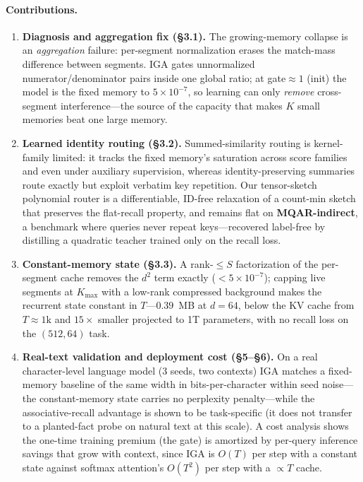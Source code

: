 \documentclass[11pt]{article}
\begin{document}
\paragraph{Contributions.}
\begin{enumerate}
\item \textbf{Diagnosis and aggregation fix (\S3.1).} The growing-memory collapse
  is an \emph{aggregation} failure: per-segment normalization erases the
  match-mass difference between segments. IGA gates unnormalized
  numerator/denominator pairs inside one global ratio; at gate$\approx 1$ (init)
  the model is the fixed memory to $5\times10^{-7}$, so learning can only
  \emph{remove} cross-segment interference---the source of the capacity that makes
  $K$ small memories beat one large memory.

\item \textbf{Learned identity routing (\S3.2).} Summed-similarity routing is
  kernel-family limited: it tracks the fixed memory's saturation across score
  families and even under auxiliary supervision, whereas identity-preserving
  summaries route exactly but exploit verbatim key repetition. Our tensor-sketch
  polynomial router \citep{pham2013tensorsketch} is a differentiable, ID-free
  relaxation of a count-min sketch that preserves the flat-recall property, and
  remains flat on \textbf{MQAR-indirect}, a benchmark where queries never repeat
  keys---recovered label-free by distilling a quadratic teacher trained only on
  the recall loss.

\item \textbf{Constant-memory state (\S3.3).} A rank-$\le S$ factorization of the
  per-segment cache removes the $d^2$ term exactly ($<\!5\times10^{-7}$); capping
  live segments at $K_{\max}$ with a low-rank compressed background makes the
  recurrent state constant in $T$---$0.39$~MB at $d=64$, below the KV cache from
  $T\!\approx\!1\mathrm{k}$ and $15\times$ smaller projected to 1T parameters,
  with no recall loss on the $(512,64)$ task.

\item \textbf{Real-text validation and deployment cost (\S5--\S6).} On a real
  character-level language model (3 seeds, two contexts) IGA matches a
  fixed-memory baseline of the same width in bits-per-character within seed
  noise---the constant-memory state carries no perplexity penalty---while the
  associative-recall advantage is shown to be task-specific (it does not transfer
  to a planted-fact probe on natural text at this scale). A cost analysis shows
  the one-time training premium (the gate) is amortized by per-query inference
  savings that grow with context, since IGA is $O(T)$ per step with a constant
  state against softmax attention's $O(T^2)$ per step with a $\propto T$ cache.
\end{enumerate}
\end{document}
